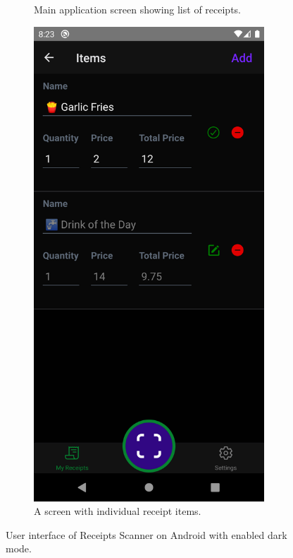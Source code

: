 \documentclass[
  digital, %
  table,   %
  oneside, %
  lof,     %
  lot,     %
]{fithesis3}
\newcommand\half{0.45}
\newcommand\subfigsize{0.95}
\begin{document}
\begin{figure}
\begin{subfigure}[t]{\half\textwidth}
      \caption{Main application screen showing list of receipts.}
    \end{subfigure}
    \begin{subfigure}[t]{\half\textwidth}
      \centering
      \includegraphics[width=\subfigsize\textwidth]{figures/screens/android/dark/items}
      \caption{A screen with individual receipt items.}
      \label{fig:dark_mode_android}
    \end{subfigure}
    \caption{User interface of Receipts Scanner on Android with enabled dark mode.}
\end{figure}
\end{document}
